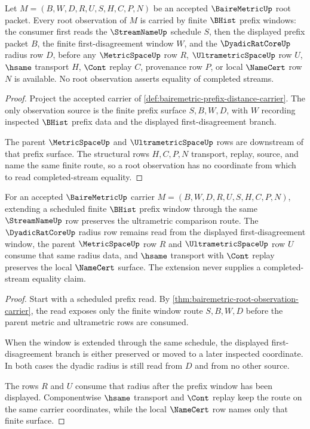 \begin{theorem}
\label{thm:bairemetric-root-observation-carrier}
Let $M=(B,W,D,R,U,S,H,C,P,N)$ be an accepted $\BaireMetricUp$ root packet. Every root observation of $M$ is carried by finite $\BHist$ prefix windows: the consumer first reads the $\StreamNameUp$ schedule $S$, then the displayed prefix packet $B$, the finite first-disagreement window $W$, and the $\DyadicRatCoreUp$ radius row $D$, before any $\MetricSpaceUp$ row $R$, $\UltrametricSpaceUp$ row $U$, $\hsame$ transport $H$, $\Cont$ replay $C$, provenance row $P$, or local $\NameCert$ row $N$ is available. No root observation asserts equality of completed streams.
\end{theorem}
\begin{proof}
Project the accepted carrier of \autoref{def:bairemetric-prefix-distance-carrier}. The only observation source is the finite prefix surface $S,B,W,D$, with $W$ recording inspected $\BHist$ prefix data and the displayed first-disagreement branch.

The parent $\MetricSpaceUp$ and $\UltrametricSpaceUp$ rows are downstream of that prefix surface. The structural rows $H,C,P,N$ transport, replay, source, and name the same finite route, so a root observation has no coordinate from which to read completed-stream equality.
\end{proof}

\begin{theorem}
\label{thm:bairemetric-ultrametric-window-stability}
For an accepted $\BaireMetricUp$ carrier $M=(B,W,D,R,U,S,H,C,P,N)$, extending a scheduled finite $\BHist$ prefix window through the same $\StreamNameUp$ row preserves the ultrametric comparison route. The $\DyadicRatCoreUp$ radius row remains read from the displayed first-disagreement window, the parent $\MetricSpaceUp$ row $R$ and $\UltrametricSpaceUp$ row $U$ consume that same radius data, and $\hsame$ transport with $\Cont$ replay preserves the local $\NameCert$ surface. The extension never supplies a completed-stream equality claim.
\end{theorem}
\begin{proof}
Start with a scheduled prefix read. By \autoref{thm:bairemetric-root-observation-carrier}, the read exposes only the finite window route $S,B,W,D$ before the parent metric and ultrametric rows are consumed.

When the window is extended through the same schedule, the displayed first-disagreement branch is either preserved or moved to a later inspected coordinate. In both cases the dyadic radius is still read from $D$ and from no other source.

The rows $R$ and $U$ consume that radius after the prefix window has been displayed. Componentwise $\hsame$ transport and $\Cont$ replay keep the route on the same carrier coordinates, while the local $\NameCert$ row names only that finite surface.
\end{proof}

